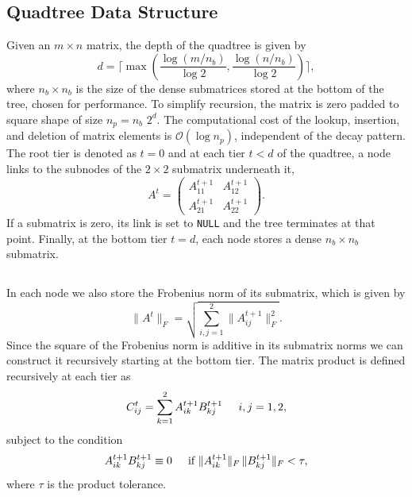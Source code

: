 \subsection{Quadtree Data Structure}
\label{sec:quadtree}

Given an $m \times n$ matrix, the depth of the quadtree is given by
\begin{equation}
d = \lceil \max \left( \frac{\log \left( m / n_{b} \right) }{\log 2},
\frac{\log \left( n / n_{b} \right) }{\log 2} \right) \rceil,
\end{equation}
where $n_{b} \times n_{b}$ is the size of the dense submatrices stored at the
bottom of the tree, chosen for performance.  To simplify recursion, the matrix
is zero padded to square shape of size $n_{p} = n_{b} \,\, 2^{d}$. The
computational cost of the lookup, insertion, and deletion of matrix elements
is $\mathcal{O} \left( \log n_{p} \right)$, independent of the decay pattern.
The root tier is denoted as $t = 0$ and at each tier $t < d$ of the quadtree,
a node links to the subnodes of the $2 \times 2$ submatrix underneath it,
\begin{equation}
A^{t} = \left(
\begin{array}{cc}
A^{t+1}_{11} & A^{t+1}_{12} \\
A^{t+1}_{21} & A^{t+1}_{22}
\end{array}
\right).
\end{equation}
If a submatrix is zero, its link is set to {\tt NULL} and the tree terminates
at that point.  Finally, at the bottom tier $t = d$, each node stores a dense
$n_{b} \times n_{b}$ submatrix.

\subsection{\SpAMM{}}
\label{sec:spamm}

In each node we also store the Frobenius norm of its submatrix, which is given
by
\begin{equation}
\lVert A^{t} \rVert_{F} = \sqrt{ \sum_{i, j = 1}^{2} \lVert A^{t+1}_{ij} \rVert^{2}_{F} }.
\end{equation}
Since the square of the Frobenius norm is additive in its submatrix norms we
can construct it recursively starting at the bottom tier. The matrix product is
defined recursively at each tier as
\begin{equation}
\label{eq:product}
C^{t}_{ij} = \sum_{k = 1}^{2} A^{t+1}_{ik} B^{t+1}_{kj}
\hspace{0.2in} i, j = 1, 2,
\end{equation}
subject to the \SpAMM{} condition
\begin{equation}
\label{eq:norm_condition}
A^{t+1}_{ik} B^{t+1}_{kj} \equiv 0
\hspace{0.2in} \mbox{if }
\lVert A^{t+1}_{ik} \rVert_{F} \, \lVert B^{t+1}_{kj} \rVert_{F} < \tau,
\end{equation}
where $\tau$ is the \SpAMM{} product tolerance.

